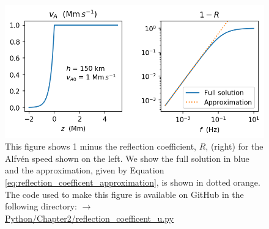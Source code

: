 \begin{figure}
    \centering
    \vspace{-20pt}
    \includegraphics{figures/chapter02/reflection_coefficent.png}
    \vspace{-20pt}
    \caption{This figure shows 1 minus the reflection coefficient, $R$, (right) for the Alfv\'en speed shown on the left. We show the full solution in blue and the approximation, given by Equation \eqref{eq:reflection_coefficent_approximation}, is shown in dotted orange. The code used to make this figure is available on GitHub in the following directory:\newline
    \href{https://github.com/aleksyprok/apkp_thesis/blob/main/Python/Chapter2/reflection_coefficent_u.py}{$\rightarrow$ Python/Chapter2/reflection\_coefficent\_u.py}}
    \vspace{-10pt}
    \label{fig:reflection_coefficent}
\end{figure}


